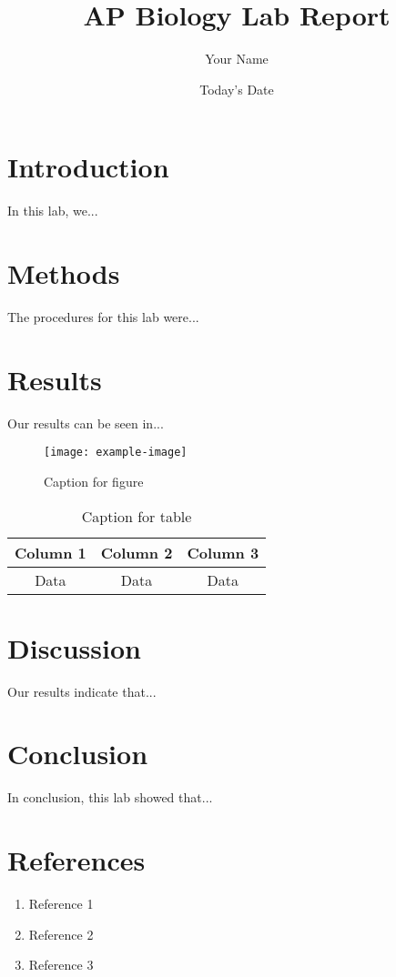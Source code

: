 \documentclass[12pt]{article}
\title{AP Biology Lab Report}
\author{Your Name}
\date{Today's Date}
\begin{document}
\maketitle

\section{Introduction}

In this lab, we...

\section{Methods}

The procedures for this lab were...

\section{Results}

Our results can be seen in...

\begin{figure}
    \centering
    \texttt{[image: example-image]}
    \caption{Caption for figure}
    \label{fig:label}
\end{figure}

\begin{table}
    \centering
    \begin{tabular}{|c|c|c|}
        \hline
        Column 1 & Column 2 & Column 3 \\
        \hline
        Data & Data & Data \\
        \hline
    \end{tabular}
    \caption{Caption for table}
    \label{tab:label}
\end{table}

\section{Discussion}

Our results indicate that...

\section{Conclusion}

In conclusion, this lab showed that...

\section{References}

\begin{enumerate}
    \item Reference 1
    \item Reference 2
    \item Reference 3
\end{enumerate}
\end{document}
